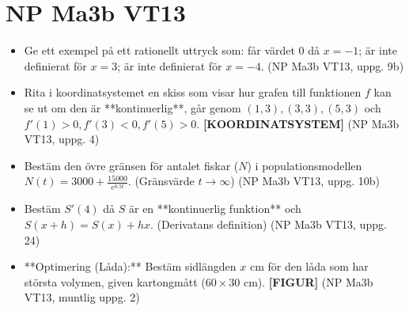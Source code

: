 \documentclass{article}
\begin{document}
\section*{NP Ma3b VT13}
\begin{itemize}
    \item Ge ett exempel på ett rationellt uttryck som: får värdet 0 då $x=-1$; är inte definierat för $x=3$; är inte definierat för $x=-4$. (NP Ma3b VT13, uppg. 9b)
    \item Rita i koordinatsystemet en skiss som visar hur grafen till funktionen $f$ kan se ut om den är **kontinuerlig**, går genom $(1, 3), (3, 3), (5, 3)$ och $f'(1)>0, f'(3)<0, f'(5)>0$. \textbf{[KOORDINATSYSTEM]} (NP Ma3b VT13, uppg. 4)
    \item Bestäm den övre gränsen för antalet fiskar ($N$) i populationsmodellen $N(t) = 3000 + \frac{15000}{e^{0.5t}}$. (Gränsvärde $t \to \infty$) (NP Ma3b VT13, uppg. 10b)
    \item Bestäm $S'(4)$ då $S$ är en **kontinuerlig funktion** och $S(x+h) = S(x) + hx$. (Derivatans definition) (NP Ma3b VT13, uppg. 24)
    \item **Optimering (Låda):** Bestäm sidlängden $x$ cm för den låda som har största volymen, given kartongmått ($60 \times 30$ cm). \textbf{[FIGUR]} (NP Ma3b VT13, muntlig uppg. 2)
\end{itemize}
\end{document}
